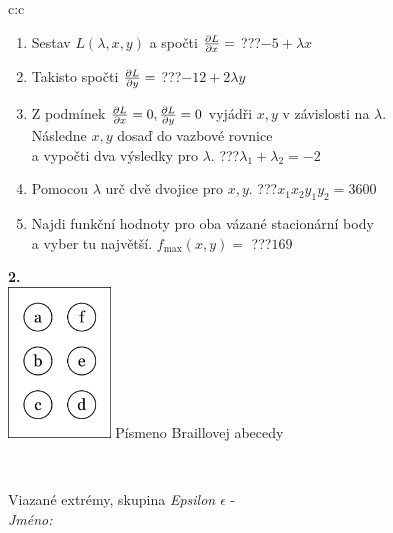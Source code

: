 \documentclass[10pt]{report}
\begin{document}
\begin{tabular}{c:c}
\begin{minipage}[c][104.5mm][t]{0.5\linewidth}
\begin{center}
\begin{minipage}{0.79\linewidth}
\begin{center}
\begin{varwidth}{\linewidth}
\begin{enumerate}
\item Sestav $L(\lambda,x,y)$ a spočti $\pdv{L}{x}=$\quad \dotfill\; ???\;\dotfill \quad $-5+\lambda x$
\item Takisto spočti $\pdv{L}{y}=$\quad \dotfill\; ???\;\dotfill \quad $-12+2\lambda y$
\item Z podmínek $\pdv{L}{x}=0 , \pdv{L}{y}=0$ vyjádři $x,y$ v závislosti na $\lambda$.\\ \phantom{xxxxxx}Následne $x,y$ dosaď do vazbové rovnice\\ \phantom{xxxxxx}a vypočti dva výsledky pro $\lambda$.\quad \dotfill\; ???\;\dotfill \quad $\lambda_1+\lambda_2=-2$
\item Pomocou $\lambda$ urč dvě dvojice pro $x,y$.\quad \dotfill\; ???\;\dotfill \quad $x_1 x_2 y_1 y_2=3600$
\item Najdi funkční hodnoty pro oba vázané stacionární body\\ \phantom{xxxxxx}a vyber tu najvětší. $f_{\text{max}}(x,y)=$\quad \dotfill\; ???\;\dotfill \quad $169$
\end{enumerate}
\end{varwidth}
\end{center}
\end{minipage}
\begin{minipage}{0.20\linewidth}
\begin{center}
{\Huge\bfseries 2.} \\[2mm]
\includegraphics[height=40mm]{../images/braille.png}
{\small Písmeno Braillovej abecedy}
\end{center}
\end{minipage}
\end{center}
\end{minipage}
\\ \hdashline
\begin{minipage}[c][104.5mm][t]{0.5\linewidth}
\begin{center}
\vspace{7mm}
{\huge Viazané extrémy, skupina \textit{Epsilon $\epsilon$} -}\\[5mm]
\textit{Jméno:}\phantom{xxxxxxxxxxxxxxxxxxxxxxxxxxxxxxxxxxxxxxxxxxxxxxxxxxxxxxxxxxxxxxxxx}\\[5mm]

\end{center}
\end{minipage}
\end{tabular}
\end{document}
